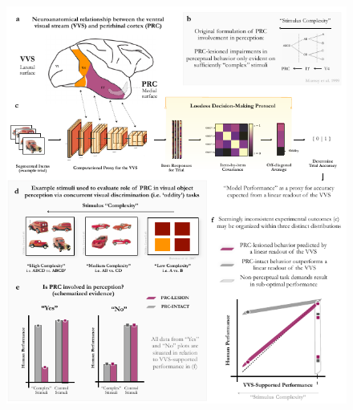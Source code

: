 \documentclass[11pt]{article}
\begin{document}
\begin{figure}[ht] 
\centering
\includegraphics[width=.8\linewidth]{figures/F1}

\end{figure}
\end{document}
